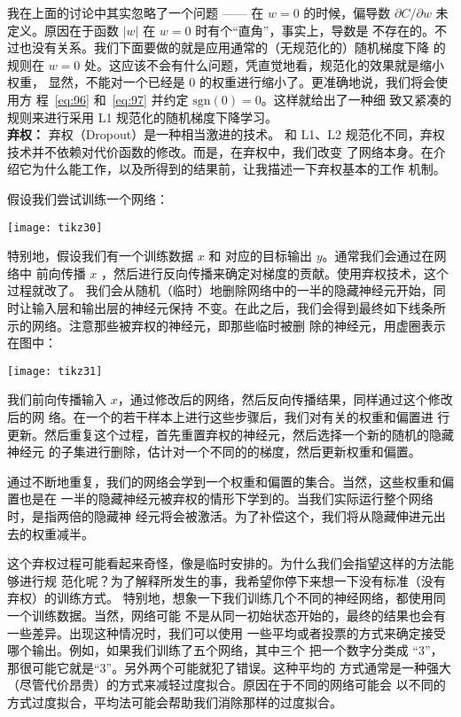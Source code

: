 我在上面的讨论中其实忽略了一个问题 —— 在 $w=0$ 的时候，偏导数 $\partial
C/\partial w$ 未定义。原因在于函数 $|w|$ 在 $w=0$ 时有个“直角”，事实上，导数是
不存在的。不过也没有关系。我们下面要做的就是应用通常的（无规范化的）随机梯度下降
的规则在 $w=0$ 处。这应该不会有什么问题，凭直觉地看，规范化的效果就是缩小权重，
显然，不能对一个已经是 $0$ 的权重进行缩小了。更准确地说，我们将会使用方
程~\eqref{eq:96} 和~\eqref{eq:97} 并约定 $\mbox{sgn}(0) = 0$。这样就给出了一种细
致又紧凑的规则来进行采用 L1 规范化的随机梯度下降学习。\\

\textbf{弃权：} 弃权（Dropout）是一种相当激进的技术。
和 L1、L2 规范化不同，弃权技术并不依赖对代价函数的修改。而是，在弃权中，我们改变
了网络本身。在介绍它为什么能工作，以及所得到的结果前，让我描述一下弃权基本的工作
机制。

假设我们尝试训练一个网络：
\begin{center}
  \texttt{[image: tikz30]}
\end{center}

特别地，假设我们有一个训练数据 $x$ 和 对应的目标输出 $y$。通常我们会通过在网络中
前向传播 $x$ ，然后进行反向传播来确定对梯度的贡献。使用弃权技术，这个过程就改了。
我们会从随机（临时）地删除网络中的一半的隐藏神经元开始，同时让输入层和输出层的神经元保持
不变。在此之后，我们会得到最终如下线条所示的网络。注意那些被弃权的神经元，即那些临时被删
除的神经元，用虚圈表示在图中：
\begin{center}
  \texttt{[image: tikz31]}
\end{center}

我们前向传播输入 $x$，通过修改后的网络，然后反向传播结果，同样通过这个修改后的网
络。在一个的若干样本上进行这些步骤后，我们对有关的权重和偏置进
行更新。然后重复这个过程，首先重置弃权的神经元，然后选择一个新的随机的隐藏神经元
的子集进行删除，估计对一个不同的\minibatch{}的梯度，然后更新权重和偏置。

通过不断地重复，我们的网络会学到一个权重和偏置的集合。当然，这些权重和偏置也是在
一半的隐藏神经元被弃权的情形下学到的。当我们实际运行整个网络时，是指两倍的隐藏神
经元将会被激活。为了补偿这个，我们将从隐藏伸进元出去的权重减半。

这个弃权过程可能看起来奇怪，像是临时安排的。为什么我们会指望这样的方法能够进行规
范化呢？为了解释所发生的事，我希望你停下来想一下没有标准（没有弃权）的训练方式。
特别地，想象一下我们训练几个不同的神经网络，都使用同一个训练数据。当然，网络可能
不是从同一初始状态开始的，最终的结果也会有一些差异。出现这种情况时，我们可以使用
一些平均或者投票的方式来确定接受哪个输出。例如，如果我们训练了五个网络，其中三个
把一个数字分类成 “3”，那很可能它就是“3”。另外两个可能就犯了错误。这种平均的
方式通常是一种强大（尽管代价昂贵）的方式来减轻过度拟合。原因在于不同的网络可能会
以不同的方式过度拟合，平均法可能会帮助我们消除那样的过度拟合。

